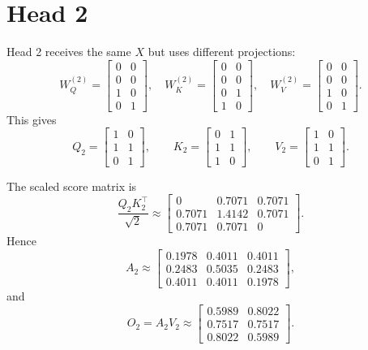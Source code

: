 \documentclass[11pt]{article}
\begin{document}
\section*{Head 2}

Head 2 receives the same $X$ but uses different projections:
\[
W_Q^{(2)}=
\begin{bmatrix}
0&0\\
0&0\\
1&0\\
0&1
\end{bmatrix},\quad
W_K^{(2)}=
\begin{bmatrix}
0&0\\
0&0\\
0&1\\
1&0
\end{bmatrix},\quad
W_V^{(2)}=
\begin{bmatrix}
0&0\\
0&0\\
1&0\\
0&1
\end{bmatrix}.
\]
This gives
\[
Q_2=
\begin{bmatrix}
1&0\\
1&1\\
0&1
\end{bmatrix},\qquad
K_2=
\begin{bmatrix}
0&1\\
1&1\\
1&0
\end{bmatrix},\qquad
V_2=
\begin{bmatrix}
1&0\\
1&1\\
0&1
\end{bmatrix}.
\]

The scaled score matrix is
\[
\frac{Q_2K_2^\top}{\sqrt{2}}
\approx
\begin{bmatrix}
0&0.7071&0.7071\\
0.7071&1.4142&0.7071\\
0.7071&0.7071&0
\end{bmatrix}.
\]
Hence
\[
A_2\approx
\begin{bmatrix}
0.1978&0.4011&0.4011\\
0.2483&0.5035&0.2483\\
0.4011&0.4011&0.1978
\end{bmatrix},
\]
and
\[
O_2=A_2V_2
\approx
\begin{bmatrix}
0.5989&0.8022\\
0.7517&0.7517\\
0.8022&0.5989
\end{bmatrix}.
\]
\end{document}
